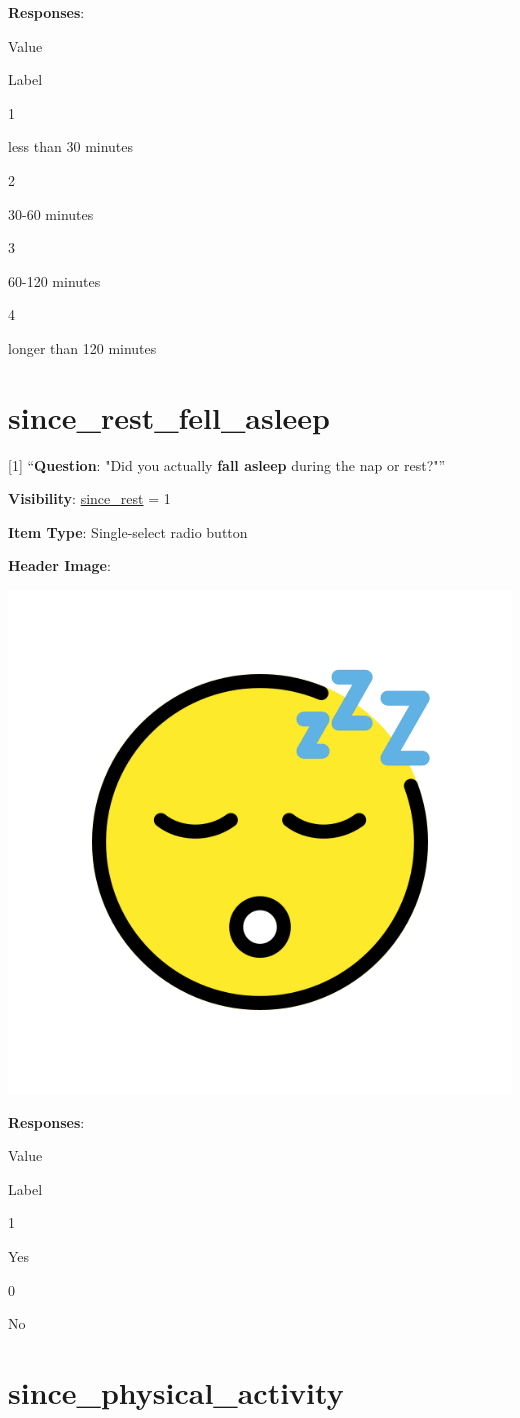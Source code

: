 \documentclass[]{book}
\begin{document}
\textbf{Responses}:

Value

Label

1

less than 30 minutes

2

30-60 minutes

3

60-120 minutes

4

longer than 120 minutes

\hypertarget{since_rest_fell_asleep}{%
\section{since\_rest\_fell\_asleep}\label{since_rest_fell_asleep}}

{[}1{]} ``\textbf{Question}: "Did you actually \textbf{fall asleep} during the nap or rest?"''

\textbf{Visibility}: \protect\hyperlink{since_rest}{since\_rest} = 1

\textbf{Item Type}: Single-select radio button

\textbf{Header Image}:

\begin{flushleft}\includegraphics[width=0.33\linewidth]{downloadFigs4latex_NIMH_Applet_Codebook/since_rest_fell_asleep_headerImg} \end{flushleft}

\textbf{Responses}:

Value

Label

1

Yes

0

No

\hypertarget{since_physical_activity}{%
\section{since\_physical\_activity}\label{since_physical_activity}}
\end{document}

